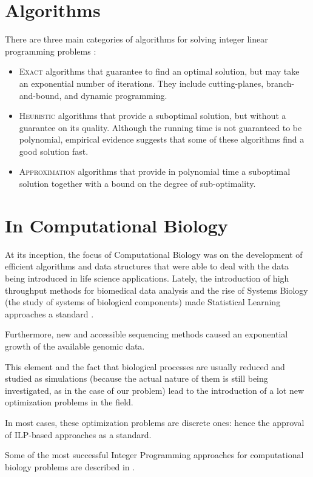 \section{Algorithms}
There are three main categories of algorithms for solving integer linear programming problems \cite{ilpalg}:
\begin{itemize}
	\item \textsc{Exact} algorithms that guarantee to find an optimal solution, but may take an exponential number of iterations. They include cutting-planes, branch-and-bound, and dynamic programming.
	\item \textsc{Heuristic} algorithms that provide a suboptimal solution, but without a guarantee on its quality. Although the running time is not guaranteed to be polynomial, empirical evidence suggests that some of these algorithms find a good solution fast.
	\item \textsc{Approximation} algorithms that provide in polynomial time a suboptimal solution together with a bound on the degree of sub-optimality.
\end{itemize}

\section{In Computational Biology}

At its inception, the focus of Computational Biology was on the development of efficient algorithms and data structures that were able to deal with the data being introduced in life science applications. Lately, the introduction of high throughput methods for biomedical data analysis and the rise of Systems Biology (the study of systems of biological components) made Statistical Learning approaches a standard \cite{ilpinb}.

Furthermore, new and accessible sequencing methods caused an exponential growth of the available genomic data.

This element and the fact that biological processes are usually reduced and studied as simulations (because the actual nature of them is still being investigated, as in the case of our problem) lead to the introduction of a lot new optimization problems in the field.

In most cases, these optimization problems are discrete ones: hence the approval of ILP-based approaches as a standard.

Some of the most successful Integer Programming approaches for computational biology problems are described in \cite{lancia2004}.

